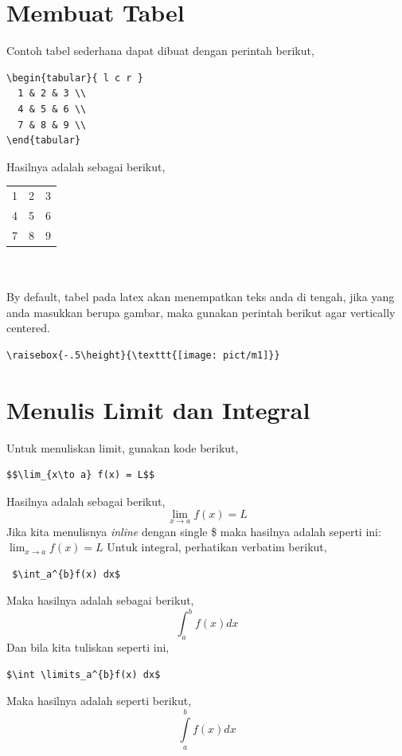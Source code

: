 \documentclass[12pt]{article}
\begin{document}
\section{Membuat Tabel}
Contoh tabel sederhana dapat dibuat dengan perintah berikut,
\begin{verbatim}
\begin{tabular}{ l c r }
  1 & 2 & 3 \\
  4 & 5 & 6 \\
  7 & 8 & 9 \\
\end{tabular}
\end{verbatim}
Hasilnya adalah sebagai berikut,\\
\begin{tabular}{ l c r }
  1 & 2 & 3 \\
  4 & 5 & 6 \\
  7 & 8 & 9 \\
\end{tabular}
\\
\\
By default, tabel pada latex akan menempatkan teks anda di tengah, jika yang anda masukkan berupa gambar, maka gunakan perintah berikut agar vertically centered.
\begin{verbatim}
\raisebox{-.5\height}{\texttt{[image: pict/m1]}}
\end{verbatim}

\section{Menulis Limit dan Integral}
Untuk menuliskan limit, gunakan kode berikut,
\begin{verbatim}
$$\lim_{x\to a} f(x) = L$$ 
\end{verbatim}
Hasilnya adalah sebagai berikut, \\
$$\lim_{x\to a} f(x) = L $$
Jika kita menulisnya \emph{inline} dengan single \$ maka hasilnya adalah seperti ini:
$\lim_{x\to a} f(x) = L$
Untuk integral, perhatikan verbatim berikut,
\begin{verbatim}
 $\int_a^{b}f(x) dx$
\end{verbatim}
Maka hasilnya adalah sebagai berikut, \\
$$\int_a^{b}f(x) dx$$
Dan bila kita tuliskan seperti ini, \\
\begin{verbatim}
$\int \limits_a^{b}f(x) dx$
\end{verbatim}
Maka hasilnya adalah seperti berikut, \\
$$\int \limits_a^{b}f(x) dx$$
\end{document}
